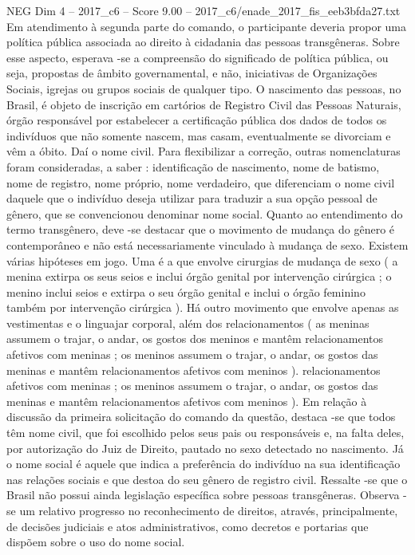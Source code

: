 \begin{textsample}{NEG Dim 4 – 2017\_c6 – Score 9.00 – 2017\_c6/enade\_2017\_fis\_eeb3bfda27.txt}
Em atendimento à segunda parte do comando, o participante deveria propor uma política pública associada ao direito à cidadania das pessoas transgêneras.
Sobre esse aspecto, esperava -se a compreensão do significado de política pública, ou seja, propostas de âmbito governamental, e não, iniciativas de Organizações Sociais, igrejas ou grupos sociais de qualquer tipo.
O nascimento das pessoas, no Brasil, é objeto de inscrição em cartórios de Registro Civil das Pessoas Naturais, órgão responsável por estabelecer a certificação pública dos dados de todos os indivíduos que não somente nascem, mas casam, eventualmente se divorciam e vêm a óbito.
Daí o nome civil.
Para flexibilizar a correção, outras nomenclaturas foram consideradas, a saber : identificação de nascimento, nome de batismo, nome de registro, nome próprio, nome verdadeiro, que diferenciam o nome civil daquele que o indivíduo deseja utilizar para traduzir a sua opção pessoal de gênero, que se convencionou denominar nome social.
Quanto ao entendimento do termo transgênero, deve -se destacar que o movimento de mudança do gênero é contemporâneo e não está necessariamente vinculado à mudança de sexo.
Existem várias hipóteses em jogo.
Uma é a que envolve cirurgias de mudança de sexo ( a menina extirpa os seus seios e inclui órgão genital por intervenção cirúrgica ; o menino inclui seios e extirpa o seu órgão genital e inclui o órgão feminino também por intervenção cirúrgica ).
Há outro movimento que envolve apenas as vestimentas e o linguajar corporal, além dos relacionamentos ( as meninas assumem o trajar, o andar, os gostos dos meninos e mantêm relacionamentos afetivos com meninas ; os meninos assumem o trajar, o andar, os gostos das meninas e mantêm relacionamentos afetivos com meninos ). relacionamentos afetivos com meninas ; os meninos assumem o trajar, o andar, os gostos das meninas e mantêm relacionamentos afetivos com meninos ).
Em relação à discussão da primeira solicitação do comando da questão, destaca -se que todos têm nome civil, que foi escolhido pelos seus pais ou responsáveis e, na falta deles, por autorização do Juiz de Direito, pautado no sexo detectado no nascimento.
Já o nome social é aquele que indica a preferência do indivíduo na sua identificação nas relações sociais e que destoa do seu gênero de registro civil.
Ressalte -se que o Brasil não possui ainda legislação específica sobre pessoas transgêneras.
Observa -se um relativo progresso no reconhecimento de direitos, através, principalmente, de decisões judiciais e atos administrativos, como decretos e portarias que dispõem sobre o uso do nome social.

\end{textsample}
